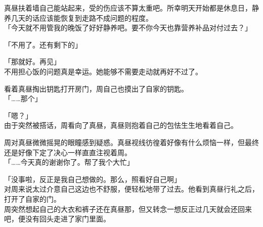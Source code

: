 真昼扶着墙自己能站起来，受的伤应该不算太重吧。所幸明天开始都是休息日，静养几天的话应该能恢复到走路不成问题的程度。\\

「今天就不用管我的晚饭了好好静养吧。要不你今天也靠营养补品对付过去？」

「不用了。还有剩下的」

「那就好。再见」\\

不用担心饭的问题真是幸运。她能够不需要走动就再好不过了。

看着真昼掏出钥匙打开房门，周自己也摸出了自家的钥匙。\\

「……那个」

「嗯？」\\

由于突然被搭话，周看向了真昼，真昼则抱着自己的包怯生生地看着自己。

周对真昼微微摇晃的眼瞳感到疑惑。真昼视线彷徨着好像有什么烦恼一样，但最终还是好像下定了决心一样直直注视着周。\\

「……今天真的谢谢你了。帮了我个大忙」

「没事啦，反正是我自己想做的。那么，照看好自己啊」\\

对周来说太过介意自己这边也不舒服，便轻松地带了过去。他看到真昼行礼之后，打开了自家的门。\\

周突然想起自己的大衣和裤子还在真昼那，但又转念一想反正过几天就会还回来吧，便没有回头走进了家门里面。

